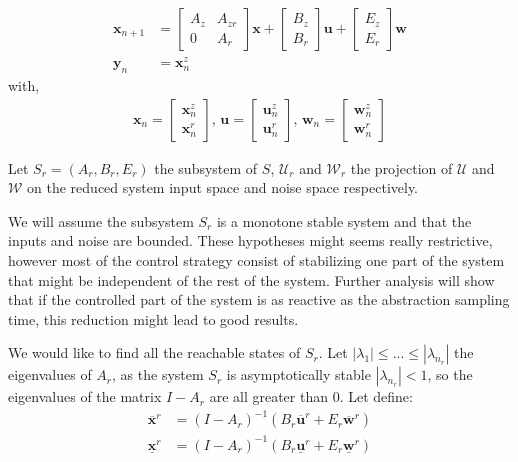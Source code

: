 \begin{align*}
\mathbf{x}_{n+1} &= 
\begin{bmatrix} A_z & A_{zr}\\ 0 & A_r \end{bmatrix} \mathbf{x}
+\begin{bmatrix} B_z \\ B_r \end{bmatrix} \mathbf{u}
+\begin{bmatrix} E_z\\ E_r \end{bmatrix}\mathbf{w}\\
\mathbf{y}_n &= \mathbf{x}^z_n
\end{align*}
with,
\begin{align*}
\mathbf{x}_n = \begin{bmatrix}
\mathbf{x}^z_n\\
\mathbf{x}^r_n
\end{bmatrix}
\textrm{, }
\mathbf{u} = \begin{bmatrix}
\mathbf{u}^z_n\\
\mathbf{u}^r_n
\end{bmatrix}
\textrm{, }
\mathbf{w}_n = \begin{bmatrix}
\mathbf{w}^z_n\\
\mathbf{w}^r_n
\end{bmatrix}
\end{align*}

Let $S_r=(A_r,B_r,E_r)$ the subsystem of $S$, $\mathcal{U}_r$ and $\mathcal{W}_r$ the projection of $\mathcal{U}$ and $\mathcal{W}$ on the reduced system input space and noise space respectively.

We will assume the subsystem $S_r$ is a monotone stable system and that the inputs and noise are bounded.
These hypotheses might seems really restrictive, however most of the control strategy consist of stabilizing one part of the system that might be independent of the rest of the system.
Further analysis will show that if the controlled part of the system is as reactive as the abstraction sampling time, this reduction might lead to good results.

We would like to find all the reachable states of $S_r$.
Let $|\lambda_1| \leq ... \leq |\lambda_{n_r}|$ the eigenvalues of $A_r$, as the system $S_r$ is asymptotically stable $|\lambda_{n_r}|<1$,
so the eigenvalues of the matrix $I-A_r$ are all greater than 0.
Let define:
\begin{equation}
\begin{split}
\overline{\mathbf{x}}^r &= (I-A_r)^{-1} (B_r \overline{\mathbf{u}}^r + E_r \overline{\mathbf{w}}^r)\\
\underline{\mathbf{x}}^r &= (I-A_r)^{-1} (B_r \underline{\mathbf{u}}^r + E_r \underline{\mathbf{w}}^r)\\
\end{split}
\end{equation}

